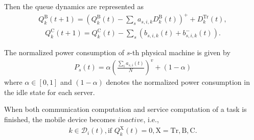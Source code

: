 Then the queue dynamics are represented as
\begin{align}
	Q_{k}^{\mathrm{B}}(t+1)=(Q_{k}^{\mathrm{B}}(t)-\sum_{s}a_{s,i,k}D_{k}^{\mathrm{B}}(t))^{+}+D_{k}^{\mathrm{Tr}}(t),
\end{align}
\begin{align}
	Q_{k}^{\mathrm{C}}(t+1)=Q_{k}^{\mathrm{C}}(t)-\sum_{s}(b_{s,i,k}(t)+b_{s,i,k}^{-}(t)).
\end{align}

The normalized power consumption of $s$-th physical machine is given by
\begin{align}
	P_{s}(t)= \alpha\left(\frac{\sum_{i}a_{s,i}(t)}{N}\right)^{v}+(1-\alpha)
\end{align}
where $\alpha\in[0,1]$ and $(1-\alpha)$ denotes the normalized power consumption in the idle state for each server.

When both communication computation and service computation of a task is finished, the mobile device becomes $\textit{inactive}$, i.e.,
\begin{align}
	k\in\mathcal{D}_{i}(t),\text{if }Q_{k}^{\mathrm{X}}(t)=0,\mathrm{X}=\mathrm{Tr},\mathrm{B},\mathrm{C}.
\end{align}